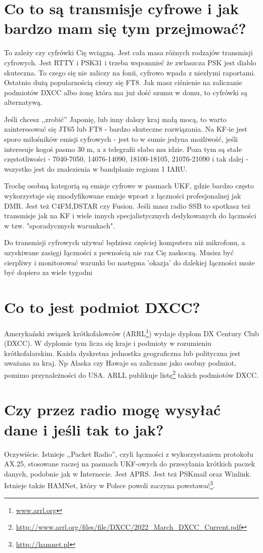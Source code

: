 \documentclass[a4paper,12pt]{article}
\begin{document}
\section{Co to są transmisje cyfrowe i jak bardzo mam się tym przejmować?}
To zależy czy cyfrówki Cię wciągną. 
Jest cała masa różnych rodzajów transmisji cyfrowych. Jest RTTY i PSK31 i trzeba wspomnieć że zwłaszcza PSK jest diablo skuteczna. To czego się nie zaliczy na fonii, cyfrowo wpada z niezłymi raportami. Ostatnio dużą popularnością cieszy się FT8.
Jak masz ciśnienie na zaliczanie podmiotów DXCC albo żonę która ma już dość szumu w domu, to cyfrówki są alternatywą.

Jeśli chcesz ,,zrobić'' Japonię, lub inny dalszy kraj małą mocą, to warto zainteresować się JT65 lub FT8 - bardzo skuteczne rozwiązania. Na KF-ie jest sporo miłośników emisji cyfrowych - jest to w sumie jedyna możliwość, jeśli interesuje kogoś pasmo 30 m, a z telegrafii słabo mu idzie. Poza tym są stałe częstotliwości - 7040-7050, 14076-14090, 18100-18105, 21076-21090 i tak dalej - wszystko jest do znalezienia w bandplanie regionu 1 IARU.

Trochę osobną kategorią są emisje cyfrowe w pasmach UKF, gdzie bardzo często wykorzystuje się zmodyfikowane emisje wprost z łączności profesjonalnej jak DMR. Jest też C4FM,DSTAR czy Fusion. Jeśli masz radio SSB to spotkasz też transmisje jak na KF i wiele innych specjalistycznych dedykowanych do łączności w tzw. "sporadycznych warunkach". 

Do transmisji cyfrowych używać będziesz częściej komputera niż mikrofonu, a uzyskiwane zasięgi łączności z pewnością nie raz Cię zaskoczą. Musisz być cierpliwy i monitorować warunki bo następna 'okazja' do dalekiej łączności może być dopiero za wiele tygodni

\section{Co to jest podmiot DXCC?}
Amerykański związek krótkofalowców (ARRL\footnote{\url{www.arrl.org}}) wydaje dyplom DX Century Club (DXCC). W dyplomie tym licza się kraje i podmioty w rozumieniu krótkofalarskim. Każda dyskretna jednostka geograficzna lub polityczna jest uważana za kraj. Np Alaska czy Hawaje sa zaliczane jako osobny podmiot, pomimo przynależności do USA. ARLL publikuje listę\footnote{\url{http://www.arrl.org/files/file/DXCC/2022_March_DXCC_Current.pdf}} takich podmiotów DXCC.

\section{Czy przez radio mogę wysyłać dane i jeśli tak to jak?}
Oczywiście. Istnieje ,,Packet Radio'', czyli łączności z wykorzystaniem protokołu AX.25, stosowane raczej na pasmach UKF-owych do przesyłania krótkich paczek danych, podobnie jak w Internecie.
Jest APRS.
Jest też PSKmail oraz Winlink.
Istnieje także HAMNet, który w Polsce powoli zaczyna powstawać\footnote{\url{http://hamnet.pl}}.
\end{document}
